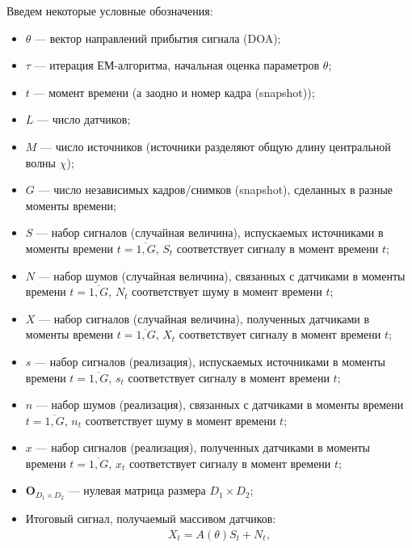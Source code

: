 \documentclass[11pt]{article}
\begin{document}
\begin{center}
\fontsize{20}{23}\selectfont {}
\end{center}
Введем некоторые условные обозначения:
\begin{itemize}
\item
$\theta$ --- вектор направлений прибытия сигнала (DOA);
\item
$\tau$ --- итерация ЕМ-алгоритма, начальная оценка параметров $\theta$;
\item
$t$ --- момент времени (а заодно и номер кадра (snapshot));
\item
$L$ --- число датчиков;
\item
$M$ --- число источников (источники разделяют общую длину центральной волны $\chi$);
\item
$G$ --- число независимых кадров/снимков (snapshot), сделанных в разные моменты времени;
\item
$S$ --- набор сигналов (случайная величина), испускаемых источниками в моменты времени $t=\overline{1,G}$, $S_t$ соответствует сигналу в момент времени $t$;
\item
$N$ --- набор шумов (случайная величина), связанных с датчиками в моменты времени $t=\overline{1,G}$, $N_t$ соответствует шуму в момент времени $t$;
\item
$X$ --- набор сигналов (случайная величина), полученных датчиками в моменты времени $t=\overline{1,G}$, $X_t$ соответствует сигналу в момент времени $t$;
\item
$s$ --- набор сигналов (реализация), испускаемых источниками в моменты времени $t=\overline{1,G}$, $s_t$ соответствует сигналу в момент времени $t$;
\item
$n$ --- набор шумов (реализация), связанных с датчиками в моменты времени $t=\overline{1,G}$, $n_t$ соответствует шуму в момент времени $t$;
\item
$x$ --- набор сигналов (реализация), полученных датчиками в моменты времени $t=\overline{1,G}$, $x_t$ соответствует сигналу в момент времени $t$;
\item
$\mathbf{O}_{D_1 \times D_2}$ --- нулевая матрица размера $D_1 \times D_2$;
\item
Итоговый сигнал, получаемый массивом датчиков:
\begin{equation}
\begin{gathered}
X_t=A(\theta)S_t+N_t,
\end{gathered}
\end{equation}

\end{itemize}
\end{document}
